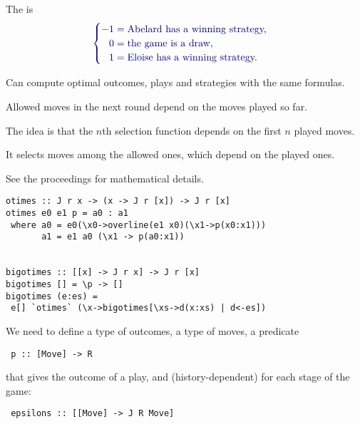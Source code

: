 \documentclass%
[%
Screen4to3,
]{foils}
\begin{document}

The  is 
\[
\darkblue{\begin{cases}
 -1 = \text{Abelard has a winning strategy,} & \\
 \phantom{-}0 = \text{the game is a draw}, & \\
 \phantom{-}1 = \text{Eloise has a winning strategy.} & 
\end{cases}}
\]

\vfill

Can compute optimal outcomes, plays and strategies with the same formulas.


\vfill

Allowed moves in the next round depend on the moves played so far.

\vfill

The idea is that the $n$th selection function depends on the first $n$ played moves.

\vfill

It selects moves among the allowed ones, which depend on the played
ones.

\vfill

See the proceedings for mathematical details.





\vfill

\begin{verbatim}
otimes :: J r x -> (x -> J r [x]) -> J r [x]
otimes e0 e1 p = a0 : a1
 where a0 = e0(\x0->overline(e1 x0)(\x1->p(x0:x1)))
       a1 = e1 a0 (\x1 -> p(a0:x1))


bigotimes :: [[x] -> J r x] -> J r [x]
bigotimes [] = \p -> []
bigotimes (e:es) =  
 e[] `otimes` (\x->bigotimes[\xs->d(x:xs) | d<-es])
\end{verbatim}

\vfill






We need to define a type  of outcomes, a type
 of moves, a predicate
\begin{verbatim}
 p :: [Move] -> R
\end{verbatim}
that gives the outcome of a play, and (history-dependent)
 for each stage of the game:
\begin{verbatim}
 epsilons :: [[Move] -> J R Move] 
\end{verbatim}
\end{document}
